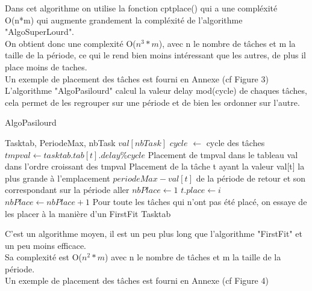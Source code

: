 \documentclass[11pt]{article}
\begin{document}
Dans cet algorithme on utilise la fonction cptplace() qui a une compléxité O(n*m) qui augmente grandement la compléxité de l'algorithme "AlgoSuperLourd".\\
On obtient donc une complexité O($n^3*m$), avec n le nombre de tâches et m la taille de la période, ce qui le rend bien moins intéressant que les autres, de plus il place moins de taches.\\
Un exemple de placement des tâches est fourni en Annexe (cf Figure 3)\\

\newpage
L'algorithme "AlgoPasilourd" calcul la valeur delay mod(cycle) de chaques tâches, cela permet de les regrouper sur une période et de bien les ordonner sur l'autre.\\
\begin{algorithm}
    \caption{AlgoPasilourd}
    \begin{algorithmic}
    \REQUIRE Tasktab, PeriodeMax, nbTask
    \STATE $val[nbTask]$
    \STATE $cycle$ $\leftarrow$ cycle des tâches
        \STATE $tmpval \leftarrow tasktab.tab[t].delay\%cycle$
        \STATE Placement de tmpval dans le tableau val dans l'ordre croissant des tmpval
    \ENDFOR
    \STATE Placement de la tâche t ayant la valeur val[t] la plus grande à l'emplacement $periodeMax - val[t]$ de la période de retour et son correspondant sur la période aller
    \STATE $nbPlace \leftarrow 1$
                        \STATE $t.place \leftarrow i$
                    \ENDIF
                \ENDFOR
                \STATE $nbPlace \leftarrow nbPlace+1$
            \ENDIF
        \ENDFOR
    \ENDFOR
    \STATE Pour toute les tâches qui n'ont pas été placé, on essaye de les placer à la manière d'un FirstFit
    \RETURN Tasktab
    \end{algorithmic}
\end{algorithm}

C'est un algorithme moyen, il est un peu plus long que l'algorithme "FirstFit" et un peu moins efficace.\\
Sa complexité est O($n^2*m$) avec n le nombre de tâches et m la taille de la période.\\ 
Un exemple de placement des tâches est fourni en Annexe (cf Figure 4)\\
\end{document}
